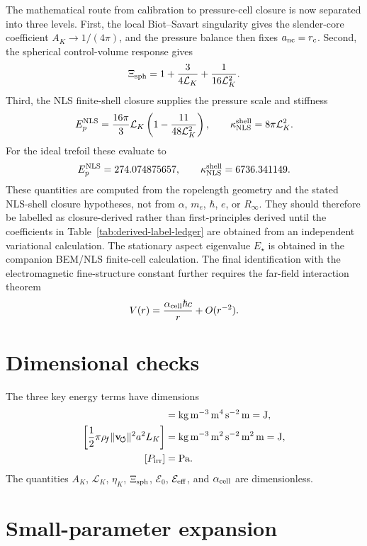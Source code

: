 \documentclass[11pt]{article}
\newcommand{\vnorm}{\lVert\mathbf{v}_{\!\boldsymbol{\circlearrowleft}}\rVert}
\newcommand{\rhof}{\rho_{\!f}}
\newcommand{\LK}{\mathcal L_K}
\newcommand{\Ezero}{\mathcal E_0}
\newcommand{\Eeff}{\mathcal E_{\rm eff}}
\newcommand{\Xisph}{\Xi_{\rm sph}}
\newcommand{\alphacell}{\alpha_{\rm cell}}
\newcommand{\EpNLS}{E_p^{\rm NLS}}
\newcommand{\kappaNLS}{\kappa_{\rm NLS}^{\rm shell}}
\begin{document}
The mathematical route from calibration to pressure-cell closure is now separated into three
levels.  First, the local Biot--Savart singularity gives the slender-core coefficient
\(A_K\to1/(4\pi)\), and the pressure balance then fixes \(a_{\rm nc}=r_c\).  Second, the
spherical control-volume response gives
\[
  \Xi_{\rm sph}
  =
  1+\frac{3}{4\mathcal L_K}+\frac{1}{16\mathcal L_K^2}.
\]
Third, the NLS finite-shell closure supplies the pressure scale and stiffness
\[
  \EpNLS
  =
  \frac{16\pi}{3}\mathcal L_K
  \left(1-\frac{11}{48\mathcal L_K^2}\right),
  \qquad
  \kappaNLS=8\pi\mathcal L_K^2.
\]
For the ideal trefoil these evaluate to
\[
  \EpNLS=274.074875657,
  \qquad
  \kappaNLS=6736.341149.
\]
These quantities are computed from the ropelength geometry and the stated NLS-shell closure hypotheses, not from
\(\alpha\), \(m_e\), \(\hbar\), \(e\), or \(R_\infty\).  They should therefore be labelled as closure-derived rather than first-principles derived until the coefficients in Table~\ref{tab:derived-label-ledger} are obtained from an independent variational calculation.  The stationary aspect eigenvalue
\(E_\star\) is obtained in the companion BEM/NLS finite-cell calculation.  The final
identification with the electromagnetic fine-structure constant further requires the
far-field interaction theorem
\[
  V(r)=\frac{\alpha_{\rm cell}\hbar c}{r}+O(r^{-2}).
\]

\appendix

\section{Dimensional checks}

The three key energy terms have dimensions
\begin{align}
  [\rhof\Gamma_0^2L_K]
  &=
  \mathrm{kg\,m^{-3}}\,
  \mathrm{m^4\,s^{-2}}\,
  \mathrm{m}
  =
  \mathrm{J},\\
  \left[\frac{1}{2}\pi\rhof\vnorm^2a^2L_K\right]
  &=
  \mathrm{kg\,m^{-3}}\,
  \mathrm{m^2\,s^{-2}}\,
  \mathrm{m^2}\,
  \mathrm{m}
  =
  \mathrm{J},\\
  [P_{\rm irr}]
  &=
  \mathrm{Pa}.
\end{align}
The quantities \(A_K\), \(\LK\), \(\eta_K\), \(\Xisph\), \(\Ezero\), \(\Eeff\), and
\(\alphacell\) are dimensionless.

\section{Small-parameter expansion}
\end{document}

